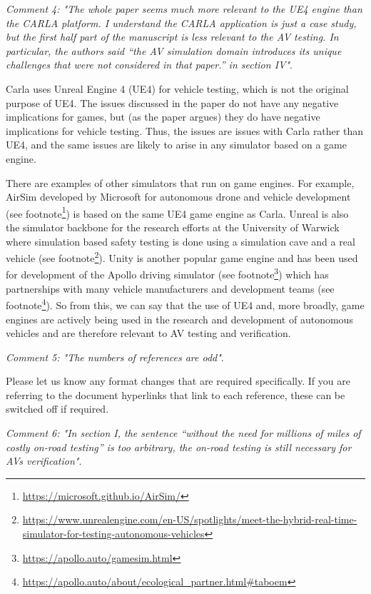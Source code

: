 \documentclass[11pt, a4paper]{letter} %
\begin{document}
\begin{letter}
\bigskip


\textit{Comment 4: "The whole paper seems much more relevant to the UE4 engine than the CARLA platform. I understand the CARLA application is just a case study, but the first half part of the manuscript is less relevant to the AV testing. In particular, the authors said “the AV simulation domain introduces its unique challenges that were not considered in that paper.” in section IV"}.

Carla uses Unreal Engine 4 (UE4) for vehicle testing, which is not the original purpose of UE4. The issues discussed in the paper do not have any negative implications for games, but (as the paper argues) they do have negative implications for vehicle testing. Thus, the issues are issues with Carla rather than UE4, and the same issues are likely to arise in any simulator based on a game engine.

There are examples of other simulators that run on game engines. For example, AirSim developed by Microsoft for autonomous drone and vehicle development (see footnote\footnote{\url{https://microsoft.github.io/AirSim/}}) is based on the same UE4 game engine as Carla. Unreal is also the simulator backbone for the research efforts at the University of Warwick where simulation based safety testing is done using a simulation cave and a real vehicle (see footnote\footnote{\url{https://www.unrealengine.com/en-US/spotlights/meet-the-hybrid-real-time-simulator-for-testing-autonomous-vehicles}}). Unity is another popular game engine and has been used for development of the Apollo driving simulator (see footnote\footnote{\url{https://apollo.auto/gamesim.html}}) which has partnerships with many vehicle manufacturers and development teams (see footnote\footnote{\url{https://apollo.auto/about/ecological\_partner.html#taboem}}). So from this, we can say that the use of UE4 and, more broadly, game engines are actively being used in the research and development of autonomous vehicles and are therefore relevant to AV testing and verification. 


\bigskip

\newpage
\textit{Comment 5: "The numbers of references are odd"}.

Please let us know any format changes that are required specifically. If you are referring to the document hyperlinks that link to each reference, these can be switched off if required.


\bigskip


\textit{Comment 6: "In section I, the sentence “without the need for millions of miles of costly on-road testing” is too arbitrary, the on-road testing is still necessary for AVs verification"}.


\end{letter}
\end{document}
